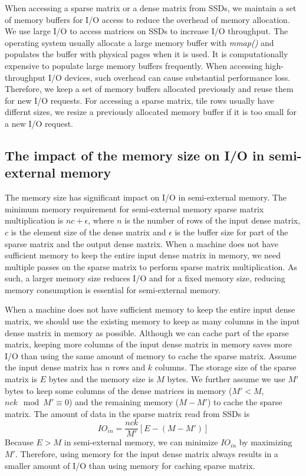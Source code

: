 When accessing a sparse matrix or a dense matrix from SSDs, we maintain a set of
memory buffers for I/O access to reduce the overhead of memory allocation.
We use large I/O to access matrices on SSDs to increase I/O throughput.
The operating system usually allocate a large memory buffer with \textit{mmap()}
and populates the buffer with physical pages when it is used. It is
computationally expensive to populate
large memory buffers frequently. When accessing high-throughput I/O devices,
such overhead can cause substantial performance loss. Therefore, we keep a set
of memory buffers allocated previously and reuse them for new I/O requests.
For accessing a sparse matrix, tile rows usually have differnt sizes, we resize
a previously allocated memory buffer if it is too small for a new I/O request.

\subsection{The impact of the memory size on I/O in semi-external memory}
\label{sec:mem}
The memory size has significant impact on I/O in semi-external memory.
The minimum memory requirement for semi-external memory sparse matrix
multiplication is $n c + \epsilon$, where $n$ is the number of rows
of the input dense matrix, $c$ is the element size of the dense matrix
and $\epsilon$ is the buffer size for part of the sparse matrix and the output
dense matrix. When a machine does not have sufficient memory to keep the entire
input dense matrix in memory, we need multiple passes on the sparse matrix to
perform sparse matrix multiplication. As such, a larger memory size reduces I/O
and for a fixed memory size, reducing memory consumption is
essential for semi-external memory.

When a machine does not have sufficient memory to keep the entire input dense
matrix, we should use the existing memory to keep as many columns in the input
dense matrix in memory as possible. Although we can cache part of the sparse
matrix,
keeping more columns of the input dense matrix in memory saves more I/O than
using the same amount of memory to cache the sparse matrix. Assume the input
dense matrix has $n$ rows and $k$ columns. The storage size of the sparse
matrix is $E$ bytes and the memory size is $M$ bytes. We further assume
we use $M'$ bytes to keep some columns of the dense matrices in memory
($M' < M$, ${n c k} \mod {M'} \equiv 0$)
and the remaining memory ($M - M'$) to cache the sparse matrix.
The amount of data in the sparse matrix read from SSDs is
\begin{equation*}
IO_{in} = \frac{n c k}{M'} [E - (M - M')]
\end{equation*}
Because $E > M$ in semi-external memory, we can minimize $IO_{in}$ by maximizing $M'$.
Therefore, using memory for the input dense matrix always results in a smaller
amount of I/O than using memory for caching sparse matrix.

